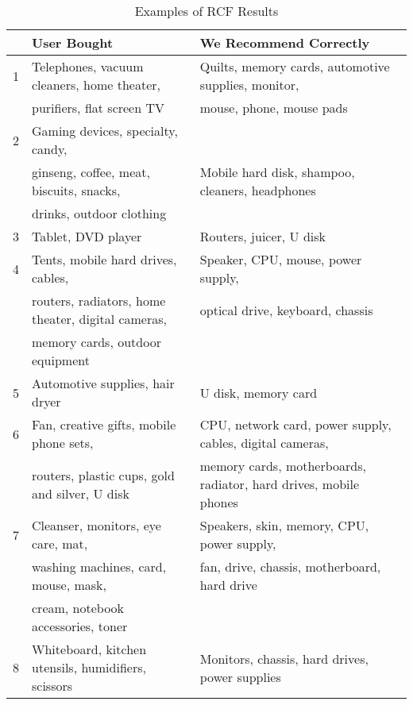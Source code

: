 
\begin{table*}[ht]
\centering
\caption{\label{tab:rec}Examples of RCF Results}
\small
\begin{tabular}{|l|l|l|}
\hline 
 & User Bought & We Recommend Correctly \\ \hline  \hline
1 & Telephones, vacuum cleaners, home theater, &
	Quilts, memory cards, automotive supplies, monitor, \\
& purifiers, flat screen TV & mouse, phone, mouse pads \\ \hline
2 & Gaming devices, specialty, candy, & \\
 & ginseng, coffee, meat, biscuits, snacks, & Mobile hard disk, shampoo, cleaners, headphones \\
& drinks, outdoor clothing & \\ \hline
3 & Tablet, DVD player & Routers, juicer, U disk \\ \hline 
4 & Tents, mobile hard drives, cables, & Speaker, CPU, mouse, power supply,  \\
 & routers, radiators, home theater, digital cameras, & optical drive, keyboard, chassis \\
 & memory cards, outdoor equipment & \\ \hline
5 & Automotive supplies, hair dryer & U disk, memory card \\ \hline
6 & Fan, creative gifts, mobile phone sets, & CPU, network card, power supply, cables, digital cameras, \\
& routers, plastic cups, gold and silver, U disk &  memory cards, motherboards, radiator, hard drives, mobile phones \\ \hline
7 & Cleanser, monitors, eye care, mat, &Speakers, skin, memory, CPU, power supply,\\
 & washing machines, card, mouse, mask, & fan, drive, chassis, motherboard, hard drive \\
 & cream, notebook accessories, toner &  \\ \hline
8& Whiteboard, kitchen utensils, humidifiers, scissors&	Monitors, chassis, hard drives, power supplies\\ \hline
\end{tabular}
\end{table*}
